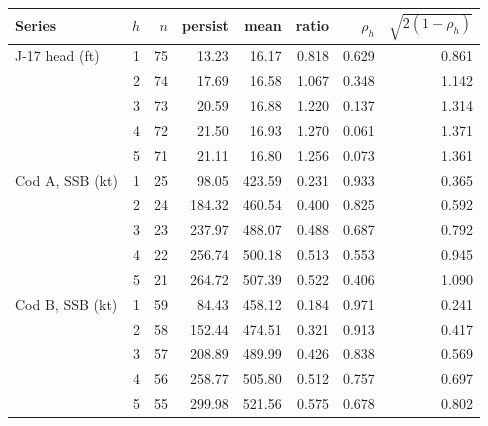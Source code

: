\begin{tabular}{@{}lrrrrrrr@{}}
\toprule
Series & $h$ & $n$ & persist & mean & ratio & $\rho_h$ & $\sqrt{2(1-\rho_h)}$ \\
\midrule
J-17 head (ft) & 1 & 75 & 13.23 & 16.17 & 0.818 & 0.629 & 0.861 \\
 & 2 & 74 & 17.69 & 16.58 & 1.067 & 0.348 & 1.142 \\
 & 3 & 73 & 20.59 & 16.88 & 1.220 & 0.137 & 1.314 \\
 & 4 & 72 & 21.50 & 16.93 & 1.270 & 0.061 & 1.371 \\
 & 5 & 71 & 21.11 & 16.80 & 1.256 & 0.073 & 1.361 \\
\midrule
Cod A, SSB (kt) & 1 & 25 & 98.05 & 423.59 & 0.231 & 0.933 & 0.365 \\
 & 2 & 24 & 184.32 & 460.54 & 0.400 & 0.825 & 0.592 \\
 & 3 & 23 & 237.97 & 488.07 & 0.488 & 0.687 & 0.792 \\
 & 4 & 22 & 256.74 & 500.18 & 0.513 & 0.553 & 0.945 \\
 & 5 & 21 & 264.72 & 507.39 & 0.522 & 0.406 & 1.090 \\
\midrule
Cod B, SSB (kt) & 1 & 59 & 84.43 & 458.12 & 0.184 & 0.971 & 0.241 \\
 & 2 & 58 & 152.44 & 474.51 & 0.321 & 0.913 & 0.417 \\
 & 3 & 57 & 208.89 & 489.99 & 0.426 & 0.838 & 0.569 \\
 & 4 & 56 & 258.77 & 505.80 & 0.512 & 0.757 & 0.697 \\
 & 5 & 55 & 299.98 & 521.56 & 0.575 & 0.678 & 0.802 \\
\bottomrule
\end{tabular}
